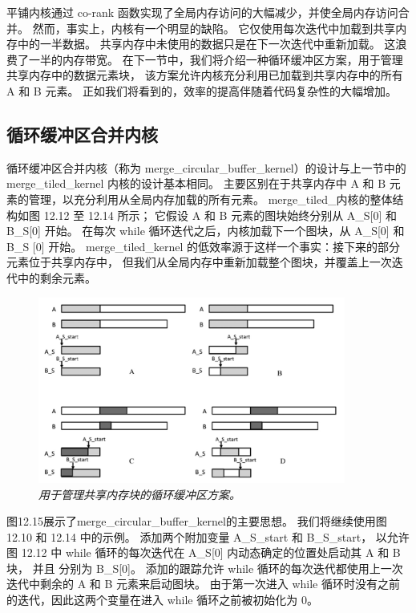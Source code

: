 平铺内核通过 co-rank 函数实现了全局内存访问的大幅减少，并使全局内存访问合并。 
然而，事实上，内核有一个明显的缺陷。 它仅使用每次迭代中加载到共享内存中的一半数据。 
共享内存中未使用的数据只是在下一次迭代中重新加载。 这浪费了一半的内存带宽。 
在下一节中，我们将介绍一种循环缓冲区方案，用于管理共享内存中的数据元素块，
该方案允许内核充分利用已加载到共享内存中的所有 A 和 B 元素。 正如我们将看到的，效率的提高伴随着代码复杂性的大幅增加。

\subsection{循环缓冲区合并内核}
循环缓冲区合并内核（称为 merge\_circular\_buffer\_kernel）的设计与上一节中的 merge\_tiled\_kernel 内核的设计基本相同。 
主要区别在于共享内存中 $\mathrm{A}$ 和 $\mathrm{B}$ 元素的管理，以充分利用从全局内存加载的所有元素。 
merge\_tiled\_内核的整体结构如图 12.12 至 12.14 所示； 
它假设 A 和 B 元素的图块始终分别从 A\_S[0] 和 B\_S[0] 开始。 
在每次 while 循环迭代之后，内核加载下一个图块，从 A\_S[0] 和 B\_S [0] 开始。 
merge\_tiled\_kernel 的低效率源于这样一个事实：接下来的部分元素位于共享内存中，
但我们从全局内存中重新加载整个图块，并覆盖上一次迭代中的剩余元素。

\begin{figure}[H]
	\centering
	\includegraphics[width=0.9\textwidth]{figs/F12.15.png}
	\caption{\textit{用于管理共享内存块的循环缓冲区方案。}}
\end{figure}

图12.15展示了merge\_circular\_buffer\_kernel的主要思想。 我们将继续使用图 12.10 和 12.14 中的示例。 
添加两个附加变量 A\_S\_start 和 B\_S\_start，
以允许图 12.12 中 while 循环的每次迭代在 A\_S[0] 内动态确定的位置处启动其 A 和 B 块，
并且 分别为 B\_S[0]。 添加的跟踪允许 while 循环的每次迭代都使用上一次迭代中剩余的 A 和 B 元素来启动图块。 
由于第一次进入 while 循环时没有之前的迭代，因此这两个变量在进入 while 循环之前被初始化为 0。

